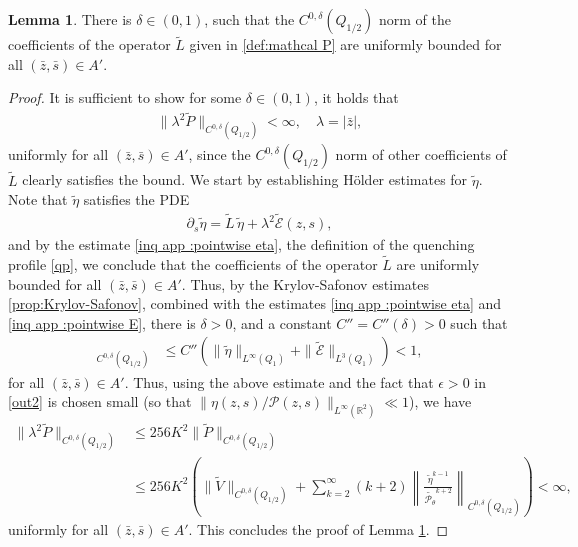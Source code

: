 \documentclass[11pt,reqno]{amsart}
\theoremstyle{definition}
\theoremstyle{bfremark}
\newtheorem{lemma}{Lemma}[section]
\numberwithin{equation}{section}
\begin{document}
    \begin{lemma}
     \label{lem:C alpha regularity}
         There is \(\delta \in (0,1)\), such that the 
        \(C^{0,\delta}(Q_{1/2})\) norm of the coefficients of the operator \(\widetilde{L}\) given in \ref{def:mathcal P} are uniformly bounded for all \((\bar{z},\bar{s}) \in A'\).
     \end{lemma}
     \begin{proof}
         It is sufficient to show for some \(\delta \in (0,1)\), it holds that
         \begin{align*}
             \|\lambda^2\widetilde{P}\|_{C^{0,\delta}(Q_{1/2})} < \infty, \quad \lambda=|\bar z|,
         \end{align*}
         uniformly for all \((\bar{z},\bar{s}) \in A'\), since the \(C^{0,\delta}(Q_{1/2})\) norm of other coefficients of \(\widetilde{L}\) clearly satisfies the bound. We start by establishing H\"older estimates for \(\widetilde{\eta}\). Note that \(\widetilde{\eta}\) satisfies the PDE 
         \begin{align*}
            \partial_s \widetilde{\eta}=\widetilde{L}\,\widetilde{\eta}+\lambda^2\widetilde{\mathcal{E}}(z,s),
        \end{align*}
        and by the estimate \ref{inq app :pointwise eta},
        the definition of the quenching profile \ref{qp}, we conclude that the coefficients of the operator \(\widetilde{L}\) are uniformly bounded for all \((\bar{z},\bar{s}) \in A'\). Thus, by the Krylov-Safonov estimates \ref{prop:Krylov-Safonov}, combined with the estimates \ref{inq app :pointwise eta} and \ref{inq app :pointwise E}, there is \(\delta>0\), and a constant \(C''=C''(\delta)>0\) such that 
        \begin{align*}
            [\widetilde{\eta}]_{C^{0,\delta}(Q_{1/2})} &\leq C''\left(\|\widetilde{\eta}\|_{L^{\infty}(Q_{1})}+\|\widetilde{\mathcal{E}}\|_{L^3(Q_{1})}\right)< 1,
        \end{align*}
        for all \((\bar{z},\bar{s}) \in A'\). Thus, using the above estimate and the fact that
        \(\epsilon>0\) in \ref{out2} is chosen small (so that \(\|\eta(z,s)/\mathcal{P}(z,s)\|_{L^{\infty}(\mathbb{R}^2)} \ll 1\)), we have
        \begin{align*}
            \|\lambda^2\widetilde{P}\|_{C^{0,\delta}(Q_{1/2})} &\leq 256K^2\|\widetilde{P}\|_{C^{0,\delta}(Q_{1/2})}\\
            & \leq 256K^2\left(\|\widetilde{V}\|_{C^{0,\delta}(Q_{1/2})}+\sum_{k=2}^{\infty}(k+2)\left\|\frac{\widetilde{\eta}^{k-1}}{\widetilde{\mathcal{P}_{\theta}}^{k+2}}\right\|_{C^{0,\delta}(Q_{1/2})}\right)< \infty,
        \end{align*}
        uniformly for all \((\bar{z},\bar{s}) \in A'\). 
        This concludes the proof of Lemma \ref{lem:C alpha regularity}.
     \end{proof}
\end{document}
